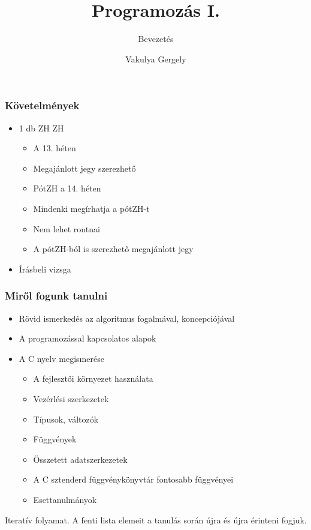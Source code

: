 \documentclass[
	11pt, %
]{beamer}
\title{Programozás I.}
\subtitle{Bevezetés}
\author{Vakulya Gergely}
\institute[UC]{Óbudai Egyetem, AMK \\ \smallskip \textit{vakulya.gergely@amk.uni-obuda.hu}}
\date{}
\begin{document}
\begin{frame}

  \titlepage

\end{frame}

\begin{frame}
  \frametitle{Követelmények}

  \begin{itemize}
    \item{1 db ZH ZH}
      \begin{itemize}
        \item{A 13. héten}
        \item{Megajánlott jegy szerezhető}
        \item{PótZH a 14. héten}
        \item{Mindenki megírhatja a pótZH-t}
        \item{Nem lehet rontnai}
        \item{A pótZH-ból is szerezhető megajánlott jegy}
      \end{itemize}
    \item{Írásbeli vizsga}
  \end{itemize}

\end{frame}

\begin{frame}
  \frametitle{Miről fogunk tanulni}

  \begin{itemize}
    \item{Rövid ismerkedés az algoritmus fogalmával, koncepciójával}
    \item{A programozással kapcsolatos alapok}
    \item{A C nyelv megismerése}
      \begin{itemize}
        \item{A fejlesztői környezet használata}
        \item{Vezérlési szerkezetek}
        \item{Típusok, változók}
        \item{Függvények}
        \item{Összetett adatszerkezetek}
        \item{A C sztenderd függvénykönyvtár fontosabb függvényei}
        \item{Esettanulmányok}
      \end{itemize}
  \end{itemize}

  Iteratív folyamat. A fenti lista elemeit a tanulás során újra és újra érinteni fogjuk.

\end{frame}
\end{document}
